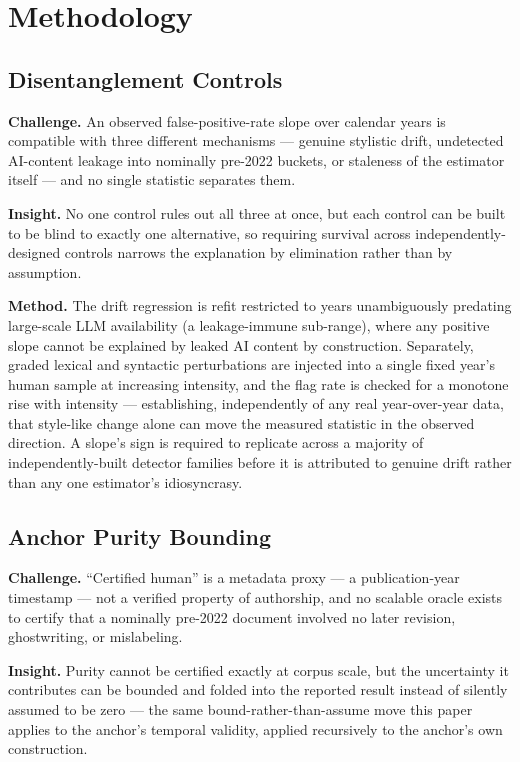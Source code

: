 \documentclass[11pt]{article}
\begin{document}
\section{Methodology}

\subsection{Disentanglement Controls}
\textbf{Challenge.} An observed false-positive-rate slope over calendar years is compatible with three different mechanisms --- genuine stylistic drift, undetected AI-content leakage into nominally pre-2022 buckets, or staleness of the estimator itself --- and no single statistic separates them.

\textbf{Insight.} No one control rules out all three at once, but each control can be built to be blind to exactly one alternative, so requiring survival across independently-designed controls narrows the explanation by elimination rather than by assumption.

\textbf{Method.} The drift regression is refit restricted to years unambiguously predating large-scale LLM availability (a leakage-immune sub-range), where any positive slope cannot be explained by leaked AI content by construction. Separately, graded lexical and syntactic perturbations are injected into a single fixed year's human sample at increasing intensity, and the flag rate is checked for a monotone rise with intensity --- establishing, independently of any real year-over-year data, that style-like change alone can move the measured statistic in the observed direction. A slope's sign is required to replicate across a majority of independently-built detector families before it is attributed to genuine drift rather than any one estimator's idiosyncrasy.

\subsection{Anchor Purity Bounding}
\textbf{Challenge.} ``Certified human'' is a metadata proxy --- a publication-year timestamp --- not a verified property of authorship, and no scalable oracle exists to certify that a nominally pre-2022 document involved no later revision, ghostwriting, or mislabeling.

\textbf{Insight.} Purity cannot be certified exactly at corpus scale, but the uncertainty it contributes can be bounded and folded into the reported result instead of silently assumed to be zero --- the same bound-rather-than-assume move this paper applies to the anchor's temporal validity, applied recursively to the anchor's own construction.
\end{document}
